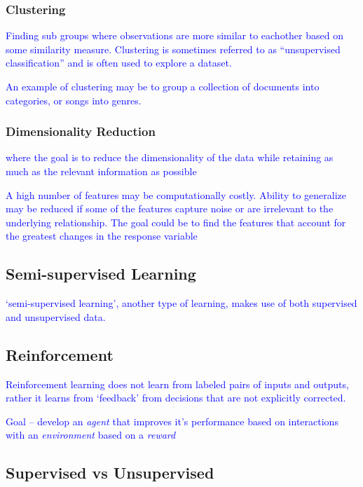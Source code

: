 \subsubsection{Clustering}

\textcolor{blue}{Finding sub groups where observations are more similar to eachother based on some similarity measure. Clustering is sometimes referred to as ``unsupervised classification'' and is often used to explore a dataset.}

\textcolor{blue}{An example of clustering may be to group a collection of documents into categories, or songs into genres.}

\subsubsection{Dimensionality Reduction}

\textcolor{blue}{where the goal is to reduce the dimensionality of the data while retaining as much as the relevant information as possible}

\textcolor{blue}{A high number of features may be computationally costly. Ability to generalize may be reduced if some of the features capture noise or are irrelevant to the underlying relationship. The goal could be to find the features that account for the greatest changes in the response variable}


\subsection{Semi-supervised Learning}

\textcolor{blue}{`semi-supervised learning', another type of learning, makes use of both supervised and unsupervised data.}

\subsection{Reinforcement}

\textcolor{blue}{Reinforcement learning does not learn from labeled pairs of inputs and outputs, rather it learns from `feedback' from decisions that are not explicitly corrected.}

\textcolor{blue}{Goal -- develop an \emph{agent} that improves it's performance based on interactions with an \emph{environment} based on a \emph{reward}}

\subsection{Supervised vs Unsupervised}

